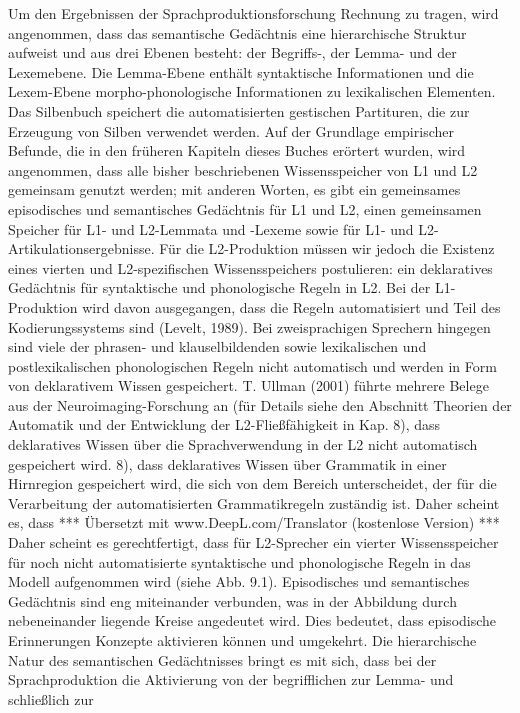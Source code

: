 \documentclass[
  letterpaper,
]{scrbook}
\begin{document}
Um den Ergebnissen der Sprachproduktionsforschung Rechnung zu tragen,
wird angenommen, dass das semantische Gedächtnis eine hierarchische
Struktur aufweist und aus drei Ebenen besteht: der Begriffs-, der Lemma-
und der Lexemebene. Die Lemma-Ebene enthält syntaktische Informationen
und die Lexem-Ebene morpho-phonologische Informationen zu lexikalischen
Elementen. Das Silbenbuch speichert die automatisierten gestischen
Partituren, die zur Erzeugung von Silben verwendet werden. Auf der
Grundlage empirischer Befunde, die in den früheren Kapiteln dieses
Buches erörtert wurden, wird angenommen, dass alle bisher beschriebenen
Wissensspeicher von L1 und L2 gemeinsam genutzt werden; mit anderen
Worten, es gibt ein gemeinsames episodisches und semantisches Gedächtnis
für L1 und L2, einen gemeinsamen Speicher für L1- und L2-Lemmata und
-Lexeme sowie für L1- und L2-Artikulationsergebnisse. Für die
L2-Produktion müssen wir jedoch die Existenz eines vierten und
L2-spezifischen Wissensspeichers postulieren: ein deklaratives
Gedächtnis für syntaktische und phonologische Regeln in L2. Bei der
L1-Produktion wird davon ausgegangen, dass die Regeln automatisiert und
Teil des Kodierungssystems sind (Levelt, 1989). Bei zweisprachigen
Sprechern hingegen sind viele der phrasen- und klauselbildenden sowie
lexikalischen und postlexikalischen phonologischen Regeln nicht
automatisch und werden in Form von deklarativem Wissen gespeichert. T.
Ullman (2001) führte mehrere Belege aus der Neuroimaging-Forschung an
(für Details siehe den Abschnitt Theorien der Automatik und der
Entwicklung der L2-Fließfähigkeit in Kap. 8), dass deklaratives Wissen
über die Sprachverwendung in der L2 nicht automatisch gespeichert wird.
8), dass deklaratives Wissen über Grammatik in einer Hirnregion
gespeichert wird, die sich von dem Bereich unterscheidet, der für die
Verarbeitung der automatisierten Grammatikregeln zuständig ist. Daher
scheint es, dass *** Übersetzt mit www.DeepL.com/Translator (kostenlose
Version) *** Daher scheint es gerechtfertigt, dass für L2-Sprecher ein
vierter Wissensspeicher für noch nicht automatisierte syntaktische und
phonologische Regeln in das Modell aufgenommen wird (siehe Abb. 9.1).
Episodisches und semantisches Gedächtnis sind eng miteinander verbunden,
was in der Abbildung durch nebeneinander liegende Kreise angedeutet
wird. Dies bedeutet, dass episodische Erinnerungen Konzepte aktivieren
können und umgekehrt. Die hierarchische Natur des semantischen
Gedächtnisses bringt es mit sich, dass bei der Sprachproduktion die
Aktivierung von der begrifflichen zur Lemma- und schließlich zur
\end{document}

